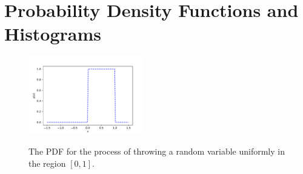 {\section{Probability Density Functions and Histograms}

\begin{figure}[htbp]
\begin{center}
{\includegraphics[width=0.45\textwidth]{figs/hist/flatpdf.pdf}}
\end{center}
\caption{\label{fig:flatpdf} The PDF for the process of throwing a
  random variable uniformly in the region $[0,1]$.}
\end{figure}

}
